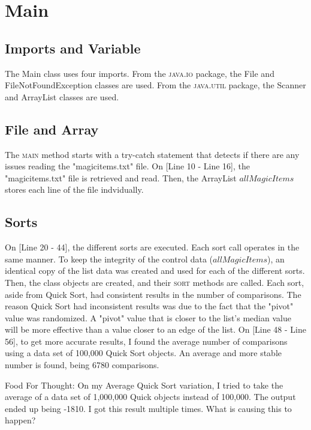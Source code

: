 \documentclass[letterpaper, 10pt,DIV=13]{scrartcl}
\begin{document}

\section{Main}

\subsection{Imports and Variable}
The Main class uses four imports. From the \textsc{java.io} package, the File and FileNotFoundException classes are used. From the \textsc{java.util} package, the Scanner and ArrayList classes are used. 

\subsection{File and Array}
The \textsc{main} method starts with a try-catch statement that detects if there are any issues reading the "magicitems.txt" file. On [Line 10 - Line 16], the "magicitems.txt" file is retrieved and read. Then, the ArrayList $allMagicItems$ stores each line of the file indvidually. 

\subsection{Sorts}
On [Line 20 - 44], the different sorts are executed. Each sort call operates in the same manner. To keep the integrity of the control data ($allMagicItems$), an identical copy of the list data was created and used for each of the different sorts. Then, the class objects are created, and their \textsc{sort} methods are called. Each sort, aside from Quick Sort, had consistent results in the number of comparisons. The reason Quick Sort had inconsistent results was due to the fact that the "pivot" value was randomized. A "pivot" value that is closer to the list's median value will be more effective than a value closer to an edge of the list. On [Line 48 - Line 56], to get more accurate results, I found the average number of comparisons using a data set of 100,000 Quick Sort objects. An average and more stable number is found, being 6780 comparisons. 

\vspace{5mm} %
Food For Thought: On my Average Quick Sort variation, I tried to take the average of a data set of 1,000,000 Quick objects instead of 100,000. The output ended up being -1810. I got this result multiple times. What is causing this to happen?
\end{document}
